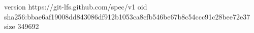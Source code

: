 version https://git-lfs.github.com/spec/v1
oid sha256:bbae6af19008dd843086df912b1053ca8cfb546be67b8c54ccc91c28bee72e37
size 349692
